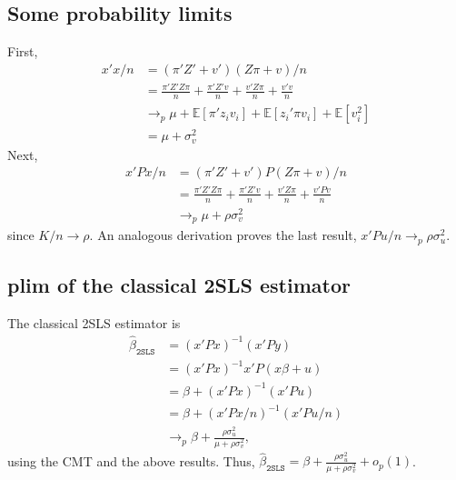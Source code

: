 \documentclass[12pt]{article}
\newcommand{\E}{\mathbb{E}}
\newcommand{\mtx}[1]{\ensuremath{\bm{\mathit{#1}}}}
\begin{document}
\subsection{Some probability limits}
First,
\begin{align*}
\mtx{x}'\mtx{x}/n &= (\mtx{\pi}'\mtx{Z}'+\mtx{v}')(\mtx{Z}\mtx{\pi}+\mtx{v})/n\\
&= \frac{\mtx{\pi}'\mtx{Z}'\mtx{Z}\mtx{\pi}}{n} + \frac{\mtx{\pi}'\mtx{Z}'\mtx{v}}{n} + \frac{\mtx{v}'\mtx{Z}\mtx{\pi}}{n} + \frac{\mtx{v}'\mtx{v}}{n}\\
&\to_p \mu + \E[\mtx{\pi}'\mtx{z}_iv_i] + \E[\mtx{z}_i'\mtx{\pi}v_i] + \E[v_i^2]\\
&=\mu + \sigma^2_v
\end{align*}
Next,
\begin{align*}
\mtx{x}'\mtx{P}\mtx{x}/n &= (\mtx{\pi}'\mtx{Z}'+\mtx{v}')\mtx{P}(\mtx{Z}\mtx{\pi}+\mtx{v})/n\\
&=\frac{\mtx{\pi}'\mtx{Z}'\mtx{Z}\mtx{\pi}}{n} + \frac{\mtx{\pi}'\mtx{Z}'\mtx{v}}{n} + \frac{\mtx{v}'\mtx{Z}\mtx{\pi}}{n} + \frac{\mtx{v}'\mtx{P}\mtx{v}}{n}\\
&\to_p \mu + \rho \sigma^2_v
\end{align*}
since $K/n \to \rho$. An analogous derivation proves the last result, $\mtx{x}'\mtx{P}\mtx{u}/n \to_p \rho \sigma^2_u$.

\subsection{plim of the classical 2SLS estimator}
The classical 2SLS estimator is
\begin{align*}
\hat\beta_{\texttt{2SLS}} &= (\mtx{x}'\mtx{P}\mtx{x})^{-1}(\mtx{x}'\mtx{P}\mtx{y})\\
&= (\mtx{x}'\mtx{P}\mtx{x})^{-1}\mtx{x}'\mtx{P}(\mtx{x}\mtx{\beta} + \mtx{u})\\
&= \beta + (\mtx{x}'\mtx{P}\mtx{x})^{-1}(\mtx{x}'\mtx{P}\mtx{u})\\
&= \beta + (\mtx{x}'\mtx{P}\mtx{x}/n)^{-1}(\mtx{x}'\mtx{P}\mtx{u}/n)\\
&\to_p \beta + \frac{\rho\sigma^2_u}{ \mu + \rho \sigma^2_v},
\end{align*}
using the CMT and the above results. Thus, $\hat\beta_{\texttt{2SLS}} = \beta + \frac{\rho\sigma^2_u}{ \mu + \rho \sigma^2_v} + o_p(1)$.
\end{document}
